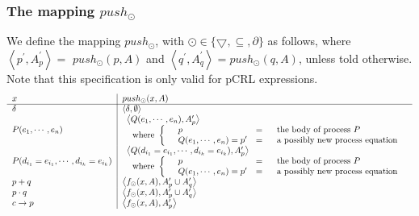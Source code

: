 \documentclass{article}
\begin{document}
\subsubsection{The mapping $push_{\odot }$}

We define the mapping $push_{\odot }$, with $\odot \in \{\bigtriangledown
,\subseteq ,\partial \}$ as follows, where $\left\langle p^{\prime
},A_{p}^{\prime }\right\rangle =$ $push_{\odot }(p,A)$ and $\left\langle
q^{\prime },A_{q}^{\prime }\right\rangle =push_{\odot }(q,A)$, unless told
otherwise. Note that this specification is only valid for pCRL expressions.%
\[
\begin{tabular}{ll}
$x$ & \multicolumn{1}{|l}{$push_{\odot }(x,A)$} \\ \cline{1-2}
$\delta $ & \multicolumn{1}{|l}{$\left\langle \delta ,\emptyset
\right\rangle $} \\ 
$P(e_{1},\cdots ,e_{n})$ & \multicolumn{1}{|l}{$%
\begin{array}{l}
\left\langle Q(e_{1},\cdots ,e_{n}),A_{p}^{\prime }\right\rangle \\ 
\text{where }\left\{ \text{ }%
\begin{array}{lll}
p & = & \text{the body of process }P \\ 
Q(e_{1},\cdots ,e_{n})=p^{\prime } & = & \text{a possibly new process
equation}%
\end{array}%
\right.%
\end{array}%
$} \\ 
$P(d_{i_{1}}=e_{i_{1}},\cdots ,d_{i_{k}}=e_{i_{k}})$ & \multicolumn{1}{|l}{$%
\begin{array}{l}
\left\langle Q(d_{i_{1}}=e_{i_{1}},\cdots
,d_{i_{k}}=e_{i_{k}}),A_{p}^{\prime }\right\rangle \\ 
\text{where }\left\{ \text{ }%
\begin{array}{lll}
p & = & \text{the body of process }P \\ 
Q(e_{1},\cdots ,e_{n})=p^{\prime } & = & \text{a possibly new process
equation}%
\end{array}%
\right.%
\end{array}%
$} \\ 
$p+q$ & \multicolumn{1}{|l}{$\left\langle f_{\odot }(x,A),A_{p}^{\prime
}\cup A_{q}^{\prime }\right\rangle $} \\ 
$p\cdot q$ & \multicolumn{1}{|l}{$\left\langle f_{\odot }(x,A),A_{p}^{\prime
}\cup A_{q}^{\prime }\right\rangle $} \\ 
$c\rightarrow p$ & \multicolumn{1}{|l}{$\left\langle f_{\odot
}(x,A),A_{p}^{\prime }\right\rangle $} \\ 

\end{tabular}\]
\end{document}
